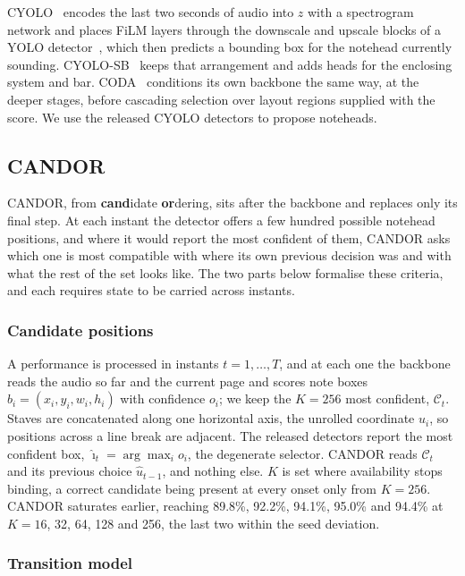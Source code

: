 \documentclass{article}
\newcommand{\sys}{CANDOR}
\begin{document}
CYOLO~\cite{henkel2021eusipco} encodes the last two seconds of audio into $z$
with a spectrogram network and places FiLM layers through the downscale and
upscale blocks of a YOLO detector~\cite{redmon2016yolo}, which then predicts a bounding box for the
notehead currently sounding. CYOLO-SB~\cite{henkel2021frontiers} keeps that
arrangement and adds heads for the enclosing system and bar.
CODA~\cite{yang2026coda} conditions its own backbone the same way, at the
deeper stages, before cascading selection over layout regions supplied with the
score. We use the released CYOLO detectors to propose noteheads.

\subsection{\sys{}}
\label{ssec:candor}

\sys{}, from \textbf{cand}idate \textbf{or}dering, sits after the backbone and
replaces only its
final step. At each instant the detector offers a few hundred possible notehead
positions, and where it would report the most confident of them, \sys{} asks
which one is most compatible with where its own previous decision was and with
what the rest of the set looks like. The two parts below formalise these
criteria, and each requires state to be carried across instants.

\subsubsection{Candidate positions}

A performance is processed in instants $t=1,\dots,T$, and at each one the
backbone reads the audio so far and the current page and scores note boxes
$b_i=(x_i,y_i,w_i,h_i)$ with confidence $o_i$; we keep the $K=256$ most
confident, $\mathcal{C}_t$. Staves are concatenated along one horizontal axis,
the unrolled coordinate $u_i$, so positions across a line break are adjacent.
The released detectors report the most confident box,
$\hat{\imath}_t=\arg\max_{i} o_i$, the degenerate selector. \sys{} reads
$\mathcal{C}_t$ and its previous choice $\hat u_{t-1}$, and nothing else. $K$ is set where availability
stops binding, a correct candidate being present at every onset only from
$K=256$. \sys{} saturates earlier, reaching 89.8\%, 92.2\%, 94.1\%, 95.0\% and
94.4\% at $K=16$, 32, 64, 128 and 256, the last two within the seed
deviation.

\subsubsection{Transition model}
\end{document}
